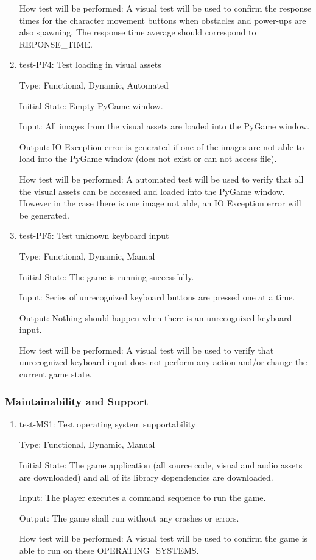 \documentclass[12pt, titlepage]{article}
\begin{document}
\begin{enumerate}
How test will be performed: A visual test will be used to confirm the response times for the character movement buttons when obstacles and power-ups are also spawning. The response time average should correspond to REPONSE\_TIME. 

\item{test-PF4: Test loading in visual assets \\}

Type: Functional, Dynamic, Automated
					
Initial State: Empty PyGame window.

Input: All images from the visual assets are loaded into the PyGame window.
					
Output: IO Exception error is generated if one of the images are not able to load into the PyGame window (does not exist or can not access file).
					
How test will be performed: A automated test will be used to verify that all the visual assets can be accessed and loaded into the PyGame window. However in the case there is one image not able,  an IO Exception error will be generated.

\item{test-PF5: Test unknown keyboard input \\}

Type: Functional, Dynamic, Manual
					
Initial State: The game is running successfully.

Input: Series of unrecognized keyboard buttons are pressed one at a time.
					
Output: Nothing should happen when there is an unrecognized keyboard input.
					
How test will be performed: A visual test will be used to verify that unrecognized keyboard input does not perform any action and/or change the current game state.

\end{enumerate}

\subsubsection{Maintainability and Support}

\begin{enumerate}
\item{test-MS1: Test operating system supportability\\}

Type: Functional, Dynamic, Manual
					
Initial State: The game application (all source code, visual and audio assets are downloaded) and all of its library dependencies are downloaded.

Input: The player executes a command sequence to run the game.
					
Output: The game shall run without any crashes or errors.
					
How test will be performed: A visual test will be used to confirm the game is able to run on these OPERATING\_SYSTEMS. 


 
\end{enumerate}
\end{document}

